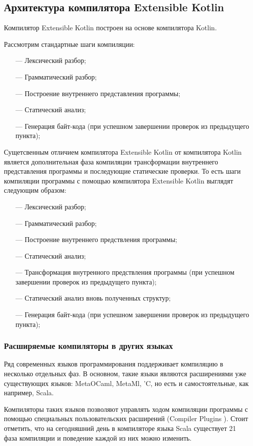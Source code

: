 \subsection{Архитектура компилятора Extensible Kotlin}
Компилятор Extensible Kotlin построен на основе компилятора Kotlin.

Рассмотрим стандартные шаги компиляции:
\begin{itemize}
\item[---] Лексический разбор;
\item[---] Грамматический разбор;
\item[---] Построение внутреннего представления программы;
\item[---] Статический анализ; \td
\item[---] Генерация байт-кода (при успешном завершении проверок из предыдущего пункта);
\end{itemize}

Сущетсвенным отличием компилятора Extensible Kotlin от компилятора Kotlin является дополнительная фаза компиляции трансформации внутреннего представления программы  и последующие статические проверки. То есть шаги компиляции программы с помощью компилятора Extensible Kotlin выглядят следующим образом:
\begin{itemize}
\item[---] Лексический разбор;
\item[---] Грамматический разбор;
\item[---] Построение внутреннего предствления программы;
\item[---] Статический анализ; \td
\item[---] Трансформация внутренного предствления программы (при успешном завершении проверок из предыдущего пункта);
\item[---] Статический анализ вновь полученных структур; \td
\item[---] Генерация байт-кода (при успешном завершении проверок из предыдущего пункта);
\end{itemize}

\subsubsection{Расширяемые компиляторы в других языках} %
Ряд современных языков программирования поддерживает компиляцию в несколько отдельных фаз.
В основном, такие языки являются расширениями уже существующих языков: MetaOCaml, MetaMl, 'C, но есть и самостоятельные, как например, Scala. \td


Компиляторы таких языков позволяют управлять ходом компиляции программы с помощью специальных пользовательских расширений (Compiler Plugins \td). Стоит отметить, что на сегодняшний день в компиляторе языка Scala существует 21 фаза компиляции и поведение каждой из них можно изменить.


